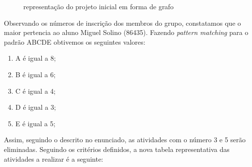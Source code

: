 \documentclass[a4paper]{report}
\begin{document}
\begin{figure}[H]
    \centering
    \caption{representação do projeto inicial em forma de grafo}
\end{figure}
Observando os números de inscrição dos membros do grupo, constatamos
que o maior pertencia ao aluno Miguel Solino (86435).
Fazendo \textit{pattern matching} para o padrão ABCDE obtivemos os seguintes
valores:

\begin{enumerate}
    \item A é igual a 8;
    \item B é igual a 6;
    \item C é igual a 4;
    \item D é igual a 3;
    \item E é igual a 5;
\end{enumerate}
Assim, seguindo o descrito no enunciado, as atividades com o número 3 e 5 serão
eliminadas.
Seguindo os critérios definidos, a nova tabela representativa das atividades a
realizar é a seguinte:
\end{document}
